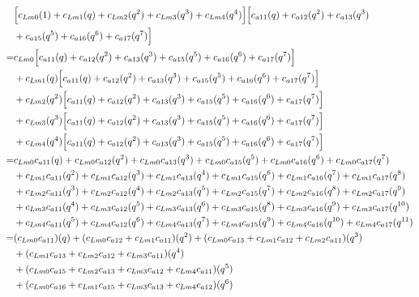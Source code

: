 \documentclass[12pt]{article}
\begin{document}
\begin{align}
    &\Bigl[ c_{Lm0}(1) + c_{Lm1}(q)  + c_{Lm2}(q^2) + c_{Lm3}(q^3) + c_{Lm4}(q^4)  \Bigr]\Bigl[ c_{a11}(q) + c_{a12}(q^2) + c_{a13}(q^3) \nonumber\\
    &+ c_{a15}(q^5) + c_{a16}(q^6) + c_{a17}(q^7) \Bigr]\\
    =& c_{Lm0}\Bigl[ c_{a11}(q) + c_{a12}(q^2) + c_{a13}(q^3) + c_{a15}(q^5) + c_{a16}(q^6) + c_{a17}(q^7) \Bigr] \nonumber\\
    &+ c_{Lm1}(q)\Bigl[ c_{a11}(q) + c_{a12}(q^2) + c_{a13}(q^3) + c_{a15}(q^5) + c_{a16}(q^6) + c_{a17}(q^7) \Bigr] \nonumber\\
    &+ c_{Lm2}(q^2)\Bigl[ c_{a11}(q) + c_{a12}(q^2) + c_{a13}(q^3) + c_{a15}(q^5) + c_{a16}(q^6) + c_{a17}(q^7) \Bigr] \nonumber\\
    &+ c_{Lm3}(q^3)\Bigl[ c_{a11}(q) + c_{a12}(q^2) + c_{a13}(q^3) + c_{a15}(q^5) + c_{a16}(q^6) + c_{a17}(q^7) \Bigr] \nonumber\\
    &+ c_{Lm4}(q^4)\Bigl[ c_{a11}(q) + c_{a12}(q^2) + c_{a13}(q^3) + c_{a15}(q^5) + c_{a16}(q^6) + c_{a17}(q^7) \Bigr] \\
    =&  c_{Lm0}c_{a11}(q) + c_{Lm0}c_{a12}(q^2) + c_{Lm0}c_{a13}(q^3) + c_{Lm0}c_{a15}(q^5) + c_{Lm0}c_{a16}(q^6) + c_{Lm0}c_{a17}(q^7) \nonumber\\
    &+ c_{Lm1}c_{a11}(q^2) + c_{Lm1}c_{a12}(q^3) + c_{Lm1}c_{a13}(q^4) + c_{Lm1}c_{a15}(q^6) + c_{Lm1}c_{a16}(q^7) + c_{Lm1}c_{a17}(q^8) \nonumber\\
    &+  c_{Lm2}c_{a11}(q^3) + c_{Lm2}c_{a12}(q^4) + c_{Lm2}c_{a13}(q^5) + c_{Lm2}c_{a15}(q^7) + c_{Lm2}c_{a16}(q^8) + c_{Lm2}c_{a17}(q^9) \nonumber\\
    &+  c_{Lm3}c_{a11}(q^4) + c_{Lm3}c_{a12}(q^5) + c_{Lm3}c_{a13}(q^6) + c_{Lm3}c_{a15}(q^8) + c_{Lm3}c_{a16}(q^9) + c_{Lm3}c_{a17}(q^{10})  \nonumber\\
    &+  c_{Lm4}c_{a11}(q^5) + c_{Lm4}c_{a12}(q^6) + c_{Lm4}c_{a13}(q^7) + c_{Lm4}c_{a15}(q^9) + c_{Lm4}c_{a16}(q^{10}) + c_{Lm4}c_{a17}(q^{11}) \\
    =& (c_{Lm0}c_{a11})(q) + (c_{Lm0}c_{a12} + c_{Lm1}c_{a11})(q^2) + (c_{Lm0}c_{a13} +  c_{Lm1}c_{a12} + c_{Lm2}c_{a11})(q^3) \nonumber\\
    &+ (c_{Lm1}c_{a13} + c_{Lm2}c_{a12} + c_{Lm3}c_{a11})(q^4) \nonumber\\
    &+ (c_{Lm0}c_{a15} + c_{Lm2}c_{a13} + c_{Lm3}c_{a12} + c_{Lm4}c_{a11})(q^5) \nonumber\\
    &+ (c_{Lm0}c_{a16} + c_{Lm1}c_{a15} + c_{Lm3}c_{a13} + c_{Lm4}c_{a12})(q^6) \nonumber\\

\end{align}
\end{document}
